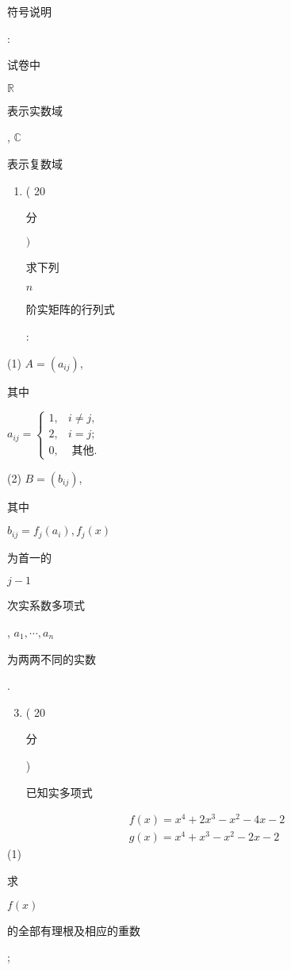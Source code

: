 \documentclass[10pt]{article}
\begin{document}
\begin{CJK}{UTF8}{mj}符号说明\end{CJK}: \begin{CJK}{UTF8}{mj}试卷中\end{CJK} $\mathbb{R}$ \begin{CJK}{UTF8}{mj}表示实数域\end{CJK}, $\mathbb{C}$ \begin{CJK}{UTF8}{mj}表示复数域\end{CJK}

\begin{enumerate}
  \item ( 20 \begin{CJK}{UTF8}{mj}分\end{CJK} $)$ \begin{CJK}{UTF8}{mj}求下列\end{CJK} $n$ \begin{CJK}{UTF8}{mj}阶实矩阵的行列式\end{CJK}:
\end{enumerate}
(1) $A=\left(a_{i j}\right)$, \begin{CJK}{UTF8}{mj}其中\end{CJK} $a_{i j}= \begin{cases}1, & i \neq j, \\ 2, & i=j ; \\ 0, & \text { 其他. }\end{cases}$

(2) $B=\left(b_{i j}\right)$, \begin{CJK}{UTF8}{mj}其中\end{CJK} $b_{i j}=f_{j}\left(a_{i}\right), f_{j}(x)$ \begin{CJK}{UTF8}{mj}为首一的\end{CJK} $j-1$ \begin{CJK}{UTF8}{mj}次实系数多项式\end{CJK}, $a_{1}, \cdots, a_{n}$ \begin{CJK}{UTF8}{mj}为两两不同的实数\end{CJK}.

\begin{enumerate}
  \setcounter{enumi}{2}
  \item ( 20 \begin{CJK}{UTF8}{mj}分\end{CJK}) \begin{CJK}{UTF8}{mj}已知实多项式\end{CJK}
\end{enumerate}
$$
\begin{gathered}
f(x)=x^{4}+2 x^{3}-x^{2}-4 x-2 \\
g(x)=x^{4}+x^{3}-x^{2}-2 x-2
\end{gathered}
$$
(1) \begin{CJK}{UTF8}{mj}求\end{CJK} $f(x)$ \begin{CJK}{UTF8}{mj}的全部有理根及相应的重数\end{CJK};
\end{document}
